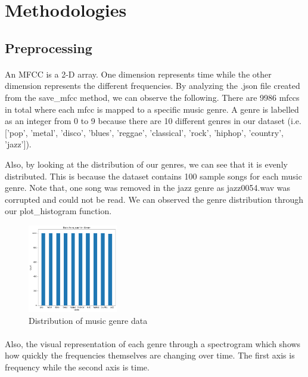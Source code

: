 \section{Methodologies}
    \subsection{Preprocessing}
        \paragraph{}
        An MFCC is a 2-D array. One dimension represents time while the other dimension represents the different frequencies. By analyzing the .json file created from the save\_mfcc method, we can observe the following. There are 9986 mfccs in total where each mfcc is mapped to a specific music genre. A genre is labelled as an integer from 0 to 9 because there are 10 different genres in our dataset (i.e. ['pop', 'metal', 'disco', 'blues', 'reggae', 'classical', 'rock', 'hiphop', 'country', 'jazz']). 
        
        Also, by looking at the distribution of our genres, we can see that it is evenly distributed. This is because the dataset contains 100 sample songs for each music genre. Note that, one song was removed in the jazz genre as jazz0054.wav was corrupted and could not be read. We can observed the genre distribution through our plot\_histogram function.
           \begin{figure}[H]
        \centering
        \includegraphics[width=0.35\textwidth]{images/genre.png} 
        \caption{Distribution of music genre data}
    \end{figure}
        
        \paragraph{}
        Also, the visual representation of each genre through a spectrogram which shows how quickly the frequencies themselves are changing over time. The first axis is frequency while the second axis is time. 
        

